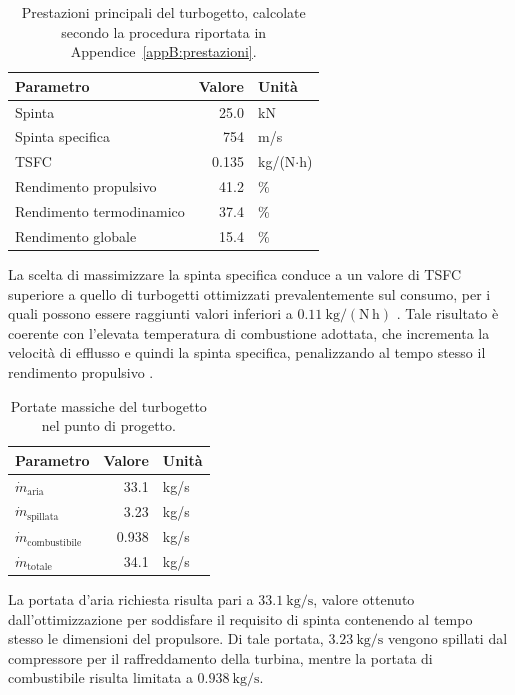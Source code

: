 \begin{table}[H]
\centering
\caption{Prestazioni principali del turbogetto, calcolate secondo la
procedura riportata in Appendice~\ref{appB:prestazioni}.}
\label{tab:prestazioni}
\fontsize{11pt}{11pt}\selectfont
\renewcommand{\arraystretch}{1}
\begin{tabular}{lrl}
\toprule
\textbf{Parametro} & \textbf{Valore} & \textbf{Unità} \\
\midrule
Spinta                    & 25.0  & kN \\
Spinta specifica          & 754 & m/s \\
TSFC                      & 0.135 & kg/(N$\cdot$h) \\
Rendimento propulsivo     & 41.2 & \% \\
Rendimento termodinamico  & 37.4 & \% \\
Rendimento globale        & 15.4 & \% \\
\bottomrule
\end{tabular}
\end{table}

La scelta di massimizzare la spinta specifica conduce a un valore di TSFC
superiore a quello di turbogetti ottimizzati prevalentemente sul consumo,
per i quali possono essere raggiunti valori inferiori a
$0.11\ \mathrm{kg/(N\,h)}$ \cite{Useller1954J71A2}. Tale risultato è
coerente con l'elevata temperatura di combustione adottata, che incrementa
la velocità di efflusso e quindi la spinta specifica, penalizzando al tempo
stesso il rendimento propulsivo \cite{slidesRobertoAndriani}.

\begin{table}[H]
\centering
\fontsize{11pt}{11pt}\selectfont
\renewcommand{\arraystretch}{1}
\caption{Portate massiche del turbogetto nel punto di progetto.}
\label{tab:mass}
\begin{tabular}{lrl}
\toprule
\textbf{Parametro} & \textbf{Valore} & \textbf{Unità} \\
\midrule
$\dot{m}_{\text{aria}}$         & 33.1 & kg/s \\
$\dot{m}_{\text{spillata}}$     & 3.23  & kg/s \\
$\dot{m}_{\text{combustibile}}$ & 0.938  & kg/s \\
$\dot{m}_{\text{totale}}$       & 34.1 & kg/s \\
\bottomrule
\end{tabular}
\end{table}

La portata d'aria richiesta risulta pari a $33.1\ \mathrm{kg/s}$, valore
ottenuto dall'ottimizzazione per soddisfare il requisito di spinta
contenendo al tempo stesso le dimensioni del propulsore. Di tale portata,
$3.23\ \mathrm{kg/s}$ vengono spillati dal compressore per il raffreddamento
della turbina, mentre la portata di combustibile risulta limitata a
$0.938\ \mathrm{kg/s}$.

